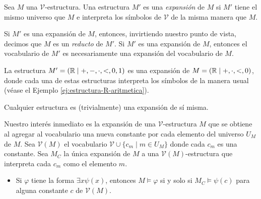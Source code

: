 \documentclass[12pt,a4paper]{book}
\newcommand{\VV}{\mathcal{V}}
\begin{document}
    \begin{definicion}\label{def:expansion-estructura}
        Sea $M$ una $\VV$-estructura. Una estructura $M'$ es una \textit{expansión} de $M$ si $M'$ tiene el mismo universo
        que $M$ e interpreta los símbolos de $\VV$ de la misma manera que $M$.
    \end{definicion}

    Si $M'$ es una expansión de $M$, entonces, invirtiendo nuestro punto de vista, decimos que $M$ es un \textit{reducto}
    de $M'$. Si $M'$ es una expansión de $M$, entonces el vocabulario de $M'$ es necesariamente una expansión del
    vocabulario de $M$.

    \begin{ejemplo}
        La estructura $M'=(\mathbb{R}\mid+,-,\cdot,<,0,1)$ es una expansión de $M=(\mathbb{R}\mid+,\cdot,<,0)$, donde cada una de estas
        estructuras interpreta los símbolos de la manera usual (véase el Ejemplo \ref{ej:estructura-R-aritmetica}).
    \end{ejemplo}

    \begin{ejemplo}
        Cualquier estructura es (trivialmente) una expansión de sí misma.
    \end{ejemplo}

    Nuestro interés inmediato es la expansión de una $\VV$-estructura $M$ que se obtiene al agregar al vocabulario una
    nueva constante por cada elemento del universo $U_{M}$ de $M$. Sea $\VV(M)$ el vocabulario $\VV\cup\{c_{m}\mid m\in U_{M}\}$
    donde cada $c_{m}$ es una constante. Sea $M_{C}$ la única expansión de $M$ a una $\VV(M)$-estructura que interpreta
    cada $c_{m}$ como el elemento $m$.

    \begin{itemize}
        \item[$\bullet$] Si $\varphi$ tiene la forma $\exists x\psi(x)$, entonces $M\models\varphi$ si y solo si
        $M_{C}\models\psi(c)$ para alguna constante $c$ de $\VV(M)$.
    \end{itemize}
\end{document}
